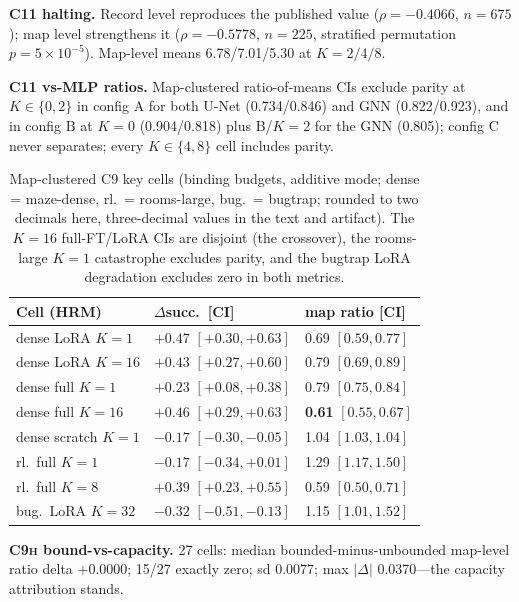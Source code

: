\documentclass[letterpaper]{article} %
\newcommand{\stage}[1]{\textsc{#1}}
\begin{document}
\textbf{\stage{C11} halting.} Record level reproduces the published value ($\rho{=}-0.4066$, $n{=}675$); map level strengthens it ($\rho{=}-0.5778$, $n{=}225$, stratified permutation $p{=}5{\times}10^{-5}$). Map-level means 6.78/7.01/5.30 at $K{=}2/4/8$.

\textbf{\stage{C11} vs-MLP ratios.} Map-clustered ratio-of-means CIs exclude parity at $K\in\{0,2\}$ in config A for both U-Net (0.734/0.846) and GNN (0.822/0.923), and in config B at $K{=}0$ (0.904/0.818) plus B/$K{=}2$ for the GNN (0.805); config C never separates; every $K\in\{4,8\}$ cell includes parity.

\begin{table}[t]
\centering
\small
\setlength{\tabcolsep}{1.5pt}
\begin{tabular}{@{}lll@{}}
\toprule
Cell (HRM) & $\Delta$succ.\ [CI] & map ratio [CI] \\
\midrule
dense LoRA $K{=}1$ & $+0.47$ $[+0.30,+0.63]$ & 0.69 $[0.59,0.77]$ \\
dense LoRA $K{=}16$ & $+0.43$ $[+0.27,+0.60]$ & 0.79 $[0.69,0.89]$ \\
dense full $K{=}1$ & $+0.23$ $[+0.08,+0.38]$ & 0.79 $[0.75,0.84]$ \\
dense full $K{=}16$ & $+0.46$ $[+0.29,+0.63]$ & \textbf{0.61} $[0.55,0.67]$ \\
dense scratch $K{=}1$ & $-0.17$ $[-0.30,-0.05]$ & 1.04 $[1.03,1.04]$ \\
rl.\ full $K{=}1$ & $-0.17$ $[-0.34,+0.01]$ & 1.29 $[1.17,1.50]$ \\
rl.\ full $K{=}8$ & $+0.39$ $[+0.23,+0.55]$ & 0.59 $[0.50,0.71]$ \\
bug.\ LoRA $K{=}32$ & $-0.32$ $[-0.51,-0.13]$ & 1.15 $[1.01,1.52]$ \\
\bottomrule
\end{tabular}
\caption{Map-clustered \stage{C9} key cells (binding budgets, additive mode; dense = maze-dense, rl.\ = rooms-large, bug.\ = bugtrap; rounded to two decimals here, three-decimal values in the text and artifact). The $K{=}16$ full-FT/LoRA CIs are disjoint (the crossover), the rooms-large $K{=}1$ catastrophe excludes parity, and the bugtrap LoRA degradation excludes zero in both metrics.}
\label{tab:wcr-c9}
\end{table}

\textbf{\stage{C9h} bound-vs-capacity.} 27 cells: median bounded-minus-unbounded map-level ratio delta $+0.0000$; 15/27 exactly zero; sd 0.0077; max $|\Delta|$ 0.0370---the capacity attribution stands.
\end{document}
